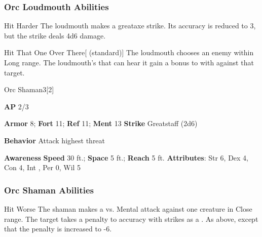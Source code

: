 \subsubsection{Orc Loudmouth Abilities}

\begin{freeability}{Hit Harder}
The loudmouth makes a greataxe strike.
Its accuracy is reduced to 3, but the strike deals 4d6 damage.
\end{freeability}

\vspace{0.5em}
\begin{freeability}{Hit That One Over There}[ (standard)]
The loudmouth chooses an enemy within Long range.
The loudmouth's  that can hear it gain a  bonus to  with  against that target.
\end{freeability}

\begin{monsection}{Orc Shaman}{3}[2]
\vspace{-1em}\vspace{-1em}
\begin{spellcontent}
\begin{spelltargetinginfo}
{\textbf{AP} 2/3}

\pari \textbf{Armor} 8;
\textbf{Fort} 11;
\textbf{Ref} 11;
\textbf{Ment} 13
\pari \textbf{Strike} Greatstaff  (2d6)



\pari \textbf{Behavior} Attack highest threat
\end{spelltargetinginfo}
\end{spellcontent}

\begin{monsterfooter}
\pari \textbf{Awareness} 
\pari \textbf{Speed} 30 ft.;
\textbf{Space} 5 ft.;
\textbf{Reach} 5 ft.
\pari \textbf{Attributes}:
Str 6,
Dex 4,
Con 4,
Int ,
Per 0,
Wil 5
\end{monsterfooter}
\end{monsection}


\subsubsection{Orc Shaman Abilities}

\begin{freeability}{Hit Worse}
The shaman makes a  vs. Mental attack against one creature in Close range.
\hit The target takes a  penalty to accuracy with strikes as a .
\crit As above, except that the penalty is increased to -6.
\end{freeability}

